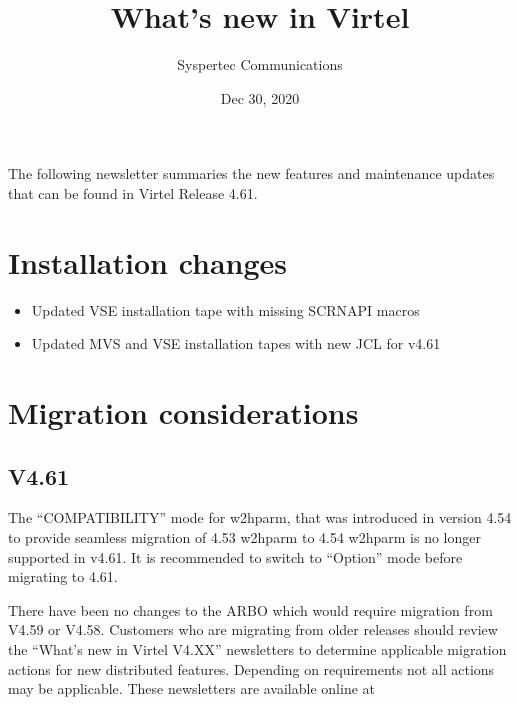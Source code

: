 \documentclass[letterpaper,10pt,english]{sphinxmanual}
\title{What's new in Virtel}
\date{Dec 30, 2020}
\author{Syspertec Communications}
\begin{document}
\pagestyle{empty}
\sphinxmaketitle
\pagestyle{plain}
\sphinxtableofcontents
\pagestyle{normal}
\label{\detokenize{TN202003::doc}}


The following newsletter summaries the new features and maintenance updates that can be found in Virtel Release 4.61.


\chapter{Installation changes}
\label{\detokenize{TN202003:installation-changes}}
\begin{itemize}
\item {} 
Updated VSE installation tape with missing SCRNAPI macros

\end{itemize}

\begin{itemize}
\item {} 
Updated MVS and VSE installation tapes with new JCL for v4.61

\end{itemize}


\chapter{Migration considerations}
\label{\detokenize{TN202003:migration-considerations}}

\section{V4.61}
\label{\detokenize{TN202003:v4-60}}

The “COMPATIBILITY” mode for w2hparm, that was introduced in version 4.54 to provide seamless migration of 4.53 w2hparm to 4.54 w2hparm is no longer supported in v4.61. It is recommended to switch to “Option” mode before migrating to 4.61.


There have been no changes to the ARBO which would require migration from V4.59 or V4.58. Customers who are migrating from older releases should review the
“What’s new in Virtel V4.XX” newsletters to determine applicable migration actions for new distributed features.
Depending on requirements not all actions may be applicable. These newsletters are available online at 
\end{document}
